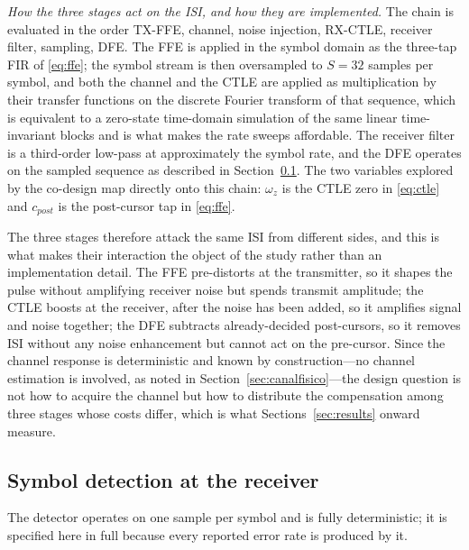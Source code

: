 \documentclass[twocolumn]{USG}
\begin{document}
\emph{How the three stages act on the ISI, and how they are implemented.} The
chain is evaluated in the order TX-FFE, channel, noise injection, RX-CTLE,
receiver filter, sampling, DFE. The FFE is applied in the symbol domain as the
three-tap FIR of \eqref{eq:ffe}; the symbol stream is then oversampled to
$S=32$ samples per symbol, and both the channel and the CTLE are applied as
multiplication by their transfer functions on the discrete Fourier transform of
that sequence, which is equivalent to a zero-state time-domain simulation of
the same linear time-invariant blocks and is what makes the rate sweeps
affordable. The receiver filter is a third-order low-pass at approximately the
symbol rate, and the DFE operates on the sampled sequence as described in
Section~\ref{sec:detector}. The two variables explored by the co-design map
directly onto this chain: $\omega_z$ is the CTLE zero in \eqref{eq:ctle} and
$c_{post}$ is the post-cursor tap in \eqref{eq:ffe}.

The three stages therefore attack the same ISI from different sides, and this
is what makes their interaction the object of the study rather than an
implementation detail. The FFE pre-distorts at the transmitter, so it shapes
the pulse without amplifying receiver noise but spends transmit amplitude; the
CTLE boosts at the receiver, after the noise has been added, so it amplifies
signal and noise together; the DFE subtracts already-decided post-cursors, so
it removes ISI without any noise enhancement but cannot act on the pre-cursor.
Since the channel response is deterministic and known by construction---no
channel estimation is involved, as noted in
Section~\ref{sec:canalfisico}---the design question is not how to acquire the
channel but how to distribute the compensation among three stages whose costs
differ, which is what Sections~\ref{sec:results} onward measure.

\subsection{Symbol detection at the receiver}
\label{sec:detector}
The detector operates on one sample per symbol and is fully deterministic; it
is specified here in full because every reported error rate is produced by it.
\end{document}
